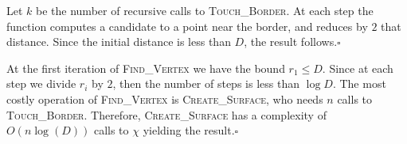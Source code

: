 \documentclass[11pt]{article}
\theoremstyle{plain}
\theoremstyle{definition}
\theoremstyle{remark}
\begin{document}
 Let $k$ be the number of recursive calls to \textsc{Touch\_Border}. At each step the function computes a candidate to a point near the border, and reduces by $2$ that distance. Since the initial distance is less than $D$, the result follows.\hfill $\square$
\medskip
\medskip
\medskip

 At the first iteration of \textsc{Find\_Vertex} we have the bound $r_1 \leq D$. Since at each step we divide $r_i$ by $2$, then the number of steps is less than $\log D$. The most costly operation of \textsc{Find\_Vertex} is \textsc{Create\_Surface}, who needs $n$ calls to \textsc{Touch\_Border}. Therefore, \textsc{Create\_Surface} has a complexity of $O( n\log(D))$ calls to $\chi$ yielding the result.\hfill$\square$
\end{document}
